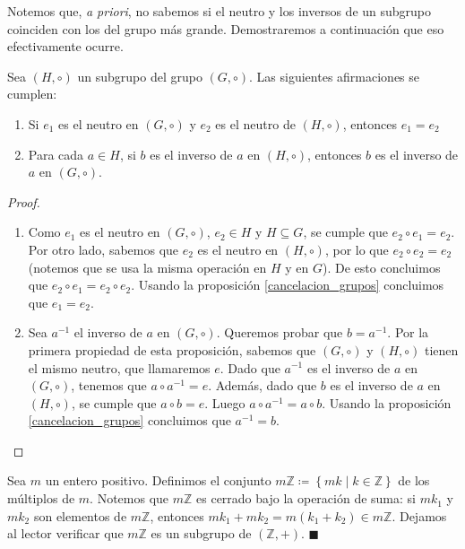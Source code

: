 Notemos que, \textit{a priori}, no sabemos si el neutro y los inversos de un subgrupo coinciden con los del grupo más grande. Demostraremos a continuación que eso efectivamente ocurre.


\begin{proposition}
Sea $(H, \circ)$ un subgrupo del grupo $(G, \circ)$. Las siguientes afirmaciones se cumplen:
	\begin{enumerate}
		\item Si $e_1$ es el neutro en $(G, \circ)$ y $e_2$ es el neutro de $(H, \circ)$, entonces $e_1 = e_2$

		\item Para cada $a \in H$, si $b$ es el inverso de $a$ en $(H, \circ)$, entonces $b$ es el inverso de $a$ en $(G, \circ)$.
	\end{enumerate}
\end{proposition}


\begin{proof} \text{ }
\begin{enumerate}
\item Como $e_1$ es el neutro en $(G, \circ)$, $e_2\in H$ y $H \subseteq G$, se cumple que $e_2 \circ e_1 = e_2$.
Por otro lado, sabemos que $e_2$ es el neutro en $(H, \circ)$, por lo que $e_2 \circ e_2 = e_2$
(notemos que se usa la misma operación en $H$ y en $G$).
De esto concluimos que $e_2 \circ e_1 = e_2 \circ e_2$. Usando la proposición \ref{cancelacion_grupos} concluimos que $e_1 = e_2$.
\item Sea $a^{-1}$ el inverso de $a$ en $(G, \circ)$. Queremos probar que $b = a^{-1}$. Por la primera propiedad de esta proposición, sabemos que $(G, \circ)$ y $(H,
\circ)$ tienen el mismo neutro, que llamaremos $e$. 
Dado que $a^{-1}$ es el inverso de $a$ en $(G, \circ)$, tenemos que $a \circ a^{-1} = e$. Además, dado que $b$ es el inverso de $a$ en $(H, \circ)$, se cumple que $a \circ b = e$. Luego $a \circ a^{-1} = a \circ b$. Usando la proposición \ref{cancelacion_grupos} concluimos que $a^{-1} = b$. \qedhere
\end{enumerate}
\end{proof}

\begin{example} \label{ejemplo_subgrupo}
Sea $m$ un entero positivo. Definimos el conjunto
$m\mathbb{Z} \coloneq \left\{mk \mid k \in \mathbb{Z}\right\}$ de los múltiplos de $m$. Notemos que $m\mathbb{Z}$ es cerrado bajo la operación de suma: si $mk_1$ y $mk_2$ son elementos de $m\mathbb{Z}$, entonces $mk_1 + mk_2 = m(k_1 + k_2) \in m\mathbb{Z}$. Dejamos al lector verificar que $m\mathbb{Z}$ es un subgrupo de $(\mathbb{Z}, +)$. \hfill$\blacksquare$
\end{example}


